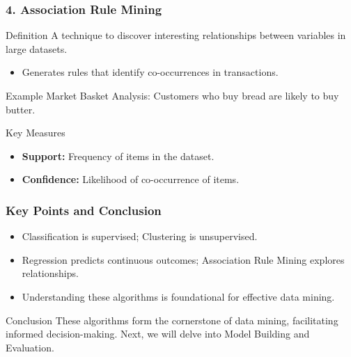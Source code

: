 \documentclass{beamer}
\begin{document}
\begin{frame}[fragile]
    \frametitle{4. Association Rule Mining}
    \begin{block}{Definition}
        A technique to discover interesting relationships between variables in large datasets.
    \end{block}
    \begin{itemize}
        \item Generates rules that identify co-occurrences in transactions.
    \end{itemize}
    \begin{block}{Example}
        Market Basket Analysis: Customers who buy bread are likely to buy butter.
    \end{block}
    \begin{block}{Key Measures}
        \begin{itemize}
            \item \textbf{Support:} Frequency of items in the dataset.
            \item \textbf{Confidence:} Likelihood of co-occurrence of items.
        \end{itemize}
    \end{block}
\end{frame}

\begin{frame}[fragile]
    \frametitle{Key Points and Conclusion}
    \begin{itemize}
        \item Classification is supervised; Clustering is unsupervised.
        \item Regression predicts continuous outcomes; Association Rule Mining explores relationships.
        \item Understanding these algorithms is foundational for effective data mining.
    \end{itemize}
    \begin{block}{Conclusion}
        These algorithms form the cornerstone of data mining, facilitating informed decision-making. Next, we will delve into Model Building and Evaluation.
    \end{block}
\end{frame}
\end{document}
